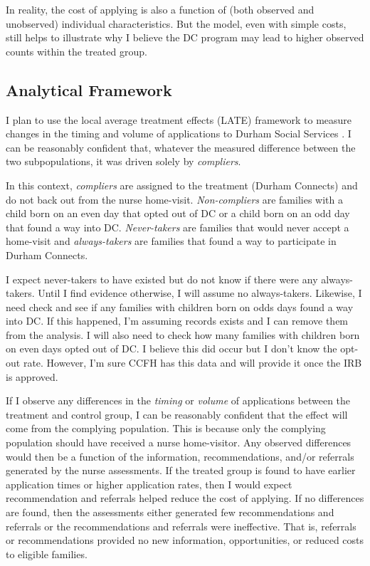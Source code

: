 \documentclass[12pt,letterpaperpaper,]{book}
\begin{document}
In reality, the cost of applying is also a function of (both observed
and unobserved) individual characteristics. But the model, even with
simple costs, still helps to illustrate why I believe the DC program may
lead to higher observed counts within the treated group.

\subsection*{Analytical Framework}\label{analytical-framework}

I plan to use the local average treatment effects (LATE) framework to
measure changes in the timing and volume of applications to Durham
Social Services \citep{angrist_mostly_2008}. I can be reasonably
confident that, whatever the measured difference between the two
subpopulations, it was driven solely by \emph{compliers}.

In this context, \emph{compliers} are assigned to the treatment (Durham
Connects) and do not back out from the nurse home-visit.
\emph{Non-compliers} are families with a child born on an even day that
opted out of DC or a child born on an odd day that found a way into DC.
\emph{Never-takers} are families that would never accept a home-visit
and \emph{always-takers} are families that found a way to participate in
Durham Connects.

I expect never-takers to have existed but do not know if there were any
always-takers. Until I find evidence otherwise, I will assume no
always-takers. Likewise, I need check and see if any families with
children born on odds days found a way into DC. If this happened, I'm
assuming records exists and I can remove them from the analysis. I will
also need to check how many families with children born on even days
opted out of DC. I believe this did occur but I don't know the opt-out
rate. However, I'm sure CCFH has this data and will provide it once the
IRB is approved.

If I observe any differences in the \emph{timing} or \emph{volume} of
applications between the treatment and control group, I can be
reasonably confident that the effect will come from the complying
population. This is because only the complying population should have
received a nurse home-visitor. Any observed differences would then be a
function of the information, recommendations, and/or referrals generated
by the nurse assessments. If the treated group is found to have earlier
application times or higher application rates, then I would expect
recommendation and referrals helped reduce the cost of applying. If no
differences are found, then the assessments either generated few
recommendations and referrals or the recommendations and referrals were
ineffective. That is, referrals or recommendations provided no new
information, opportunities, or reduced costs to eligible families.
\end{document}
